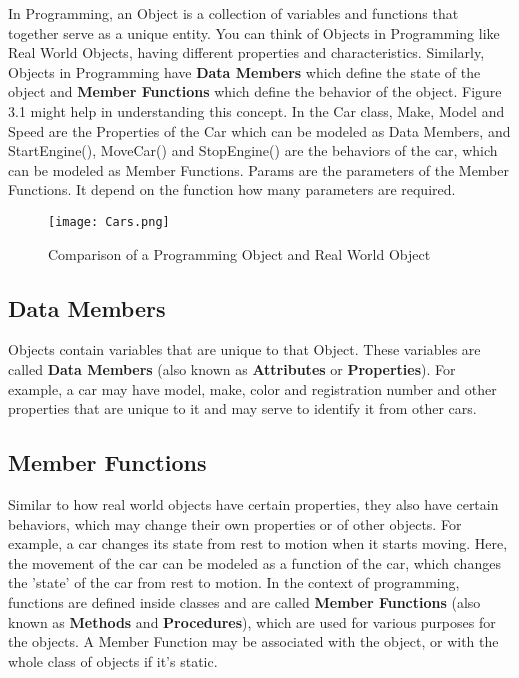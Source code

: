 \documentclass[11pt,fleqn]{book} %
\begin{document}
In Programming, an Object is a collection of variables and functions that together serve as a unique entity. You can think of Objects in Programming like Real World Objects, having different properties and characteristics. Similarly, Objects in Programming have \textbf{Data Members} which define the state of the object and \textbf{Member Functions} which define the behavior of the object. Figure 3.1 might help in understanding this concept. In the Car class, Make, Model and Speed are the Properties of the Car which can be modeled as Data Members, and StartEngine(), MoveCar() and StopEngine() are the behaviors of the car, which can be modeled as Member Functions. Params are the parameters of the Member Functions. It depend on the function how many parameters are required. 

\begin{figure}[H]
    \centering
    \texttt{[image: Cars.png]}
    \caption{Comparison of a Programming Object and Real World Object}
    \label{fig:my_label}
\end{figure}

\subsection{Data Members}

Objects contain variables that are unique to that Object. These variables are called \textbf{Data Members} (also known as \textbf{Attributes} or 
\textbf{Properties}). For example, a car may have model, make, color and registration number and other properties that are unique to it and may serve to identify it from other cars.


\subsection{Member Functions}

Similar to how real world objects have certain properties, they also have certain behaviors, which may change their own properties or of other objects. For example, a car changes its state from rest to motion when it starts moving. Here, the movement of the car can be modeled as a function of the car, which changes the 'state' of the car from rest to motion.
In the context of programming, functions are defined inside classes and are called \textbf{Member Functions} (also known as \textbf{Methods} and \textbf{Procedures}), which are used for various purposes for the objects. A Member Function may be associated with the object, or with the whole class of objects if it's static. 
\end{document}
